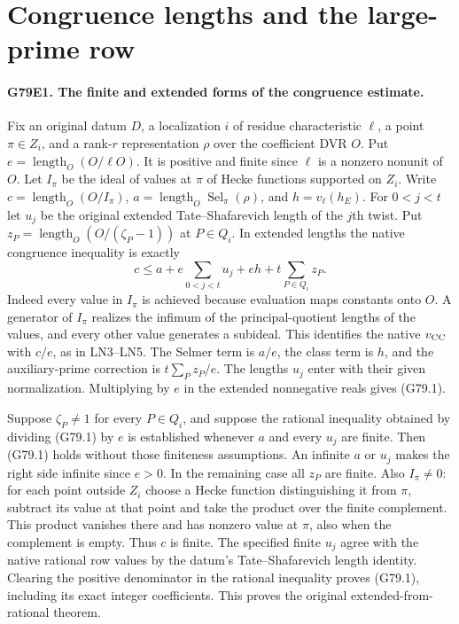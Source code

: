 \section{Congruence lengths and the large-prime row}

\paragraph{G79E1. The finite and extended forms of the congruence estimate.}
Fix an original datum $D$, a localization $i$ of residue characteristic
$\ell$, a point $\pi\in Z_i$, and a rank-$r$ representation $\rho$ over
the coefficient DVR $O$. Put $e=\operatorname{length}_O(O/\ell O)$.
It is positive and finite since $\ell$ is a nonzero nonunit of $O$.
Let $I_\pi$ be the ideal of values at $\pi$ of Hecke functions supported
on $Z_i$. Write $c=\operatorname{length}_O(O/I_\pi)$,
$a=\operatorname{length}_O\operatorname{Sel}_\pi(\rho)$, and
$h=v_\ell(h_E)$. For $0<j<t$ let $u_j$ be the original extended
Tate--Shafarevich length of the $j$th twist. Put
$z_P=\operatorname{length}_O(O/(\zeta_P-1))$ at $P\in Q_i$.
In extended lengths the native congruence inequality is exactly
\[
 c\le a+e\sum_{0<j<t}u_j+eh+t\sum_{P\in Q_i}z_P.                 \tag{G79.1}
\]
Indeed every value in $I_\pi$ is achieved because evaluation maps
constants onto $O$. A generator of $I_\pi$ realizes the infimum of
the principal-quotient lengths of the values, and every other value
generates a subideal. This identifies the native $v_{\rm CC}$ with
$c/e$, as in LN3--LN5. The Selmer term is $a/e$, the class term is
$h$, and the auxiliary-prime correction is $t\sum_P z_P/e$.
The lengths $u_j$ enter with their given normalization. Multiplying
by $e$ in the extended nonnegative reals gives (G79.1).

Suppose $\zeta_P\ne1$ for every $P\in Q_i$, and suppose the rational
inequality obtained by dividing (G79.1) by $e$ is established whenever
$a$ and every $u_j$ are finite. Then (G79.1) holds without those
finiteness assumptions. An infinite $a$ or $u_j$ makes the right side
infinite since $e>0$. In the remaining case all $z_P$ are finite.
Also $I_\pi\ne0$: for each point outside $Z_i$ choose a Hecke
function distinguishing it from $\pi$, subtract its value at that
point and take the product over the finite complement. This product
vanishes there and has nonzero value at $\pi$, also when the
complement is empty. Thus $c$ is finite. The specified finite
$u_j$ agree with the native rational row values by the datum's
Tate--Shafarevich length identity. Clearing the positive denominator
in the rational inequality proves (G79.1), including its exact integer
coefficients. This proves the original extended-from-rational theorem.

